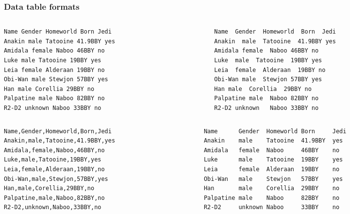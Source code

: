 \documentclass{beamer}\usepackage[]{graphicx}\usepackage[]{color}
\begin{document}
\begin{frame}[fragile]
\frametitle{Data table formats}

\begin{columns}[t]
\begin{column}{0.35\textwidth}
{\tiny \begin{verbatim}
Name Gender Homeworld Born Jedi
Anakin male Tatooine 41.9BBY yes  
Amidala female Naboo 46BBY no
Luke male Tatooine 19BBY yes
Leia female Alderaan 19BBY no
Obi-Wan male Stewjon 57BBY yes
Han male Corellia 29BBY no
Palpatine male Naboo 82BBY no
R2-D2 unknown Naboo 33BBY no
\end{verbatim}}
\end{column}
\begin{column}{0.4\textwidth}
{\tiny \begin{verbatim}
Name  Gender  Homeworld  Born  Jedi
Anakin  male  Tatooine  41.9BBY yes	
Amidala female  Naboo 46BBY no
Luke  male  Tatooine  19BBY yes
Leia  female  Alderaan  19BBY no
Obi-Wan male  Stewjon 57BBY yes
Han male  Corellia  29BBY no
Palpatine male  Naboo 82BBY no
R2-D2 unknown	Naboo 33BBY no
\end{verbatim}}
\end{column}
\end{columns}

\vspace{5mm}

\begin{columns}[t]
\begin{column}{0.35\textwidth}
{\tiny \begin{verbatim}
Name,Gender,Homeworld,Born,Jedi
Anakin,male,Tatooine,41.9BBY,yes  
Amidala,female,Naboo,46BBY,no
Luke,male,Tatooine,19BBY,yes
Leia,female,Alderaan,19BBY,no
Obi-Wan,male,Stewjon,57BBY,yes
Han,male,Corellia,29BBY,no
Palpatine,male,Naboo,82BBY,no
R2-D2,unknown,Naboo,33BBY,no
\end{verbatim}}
\end{column}
\begin{column}{0.4\textwidth}
{\tiny \begin{verbatim}
Name      Gender  Homeworld Born     Jedi
Anakin    male    Tatooine  41.9BBY  yes  
Amidala   female  Naboo     46BBY    no
Luke      male    Tatooine  19BBY    yes
Leia      female  Alderaan  19BBY    no
Obi-Wan   male    Stewjon   57BBY    yes
Han       male    Corellia  29BBY    no
Palpatine male    Naboo     82BBY    no
R2-D2     unknown Naboo     33BBY    no
\end{verbatim}}
\end{column}
\end{columns}

\end{frame}
\end{document}
